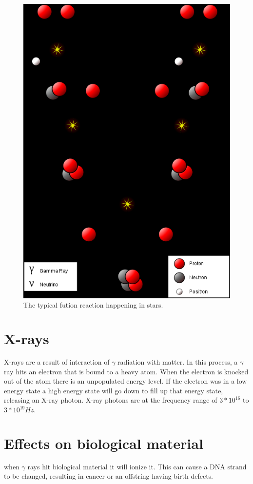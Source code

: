 \documentclass[]{article}
\begin{document}
\begin{figure}
	\includegraphics[width=\linewidth]{fusion-reaction.png}
	\caption{The typical fution reaction happening in stars.}
	\label{fig:Fusion reaction}
\end{figure}

\section{X-rays}

X-rays are a result of interaction of $\gamma$ radiation with matter. In this process, a $\gamma$ ray hits an electron that is bound to a heavy atom. When the electron is knocked out of the atom there is an unpopulated energy level. If the electron was in a low energy state a high energy state will go down to fill up that energy state, releasing an X-ray photon. X-ray photons are at the frequency range of $3*10^{16}$ to $3*10^{19}Hz$.

\section{Effects on biological material}

when $\gamma$ rays hit biological material it will ionize it. This can cause a DNA strand to be changed, resulting in cancer or an offstring having birth defects.
\end{document}
